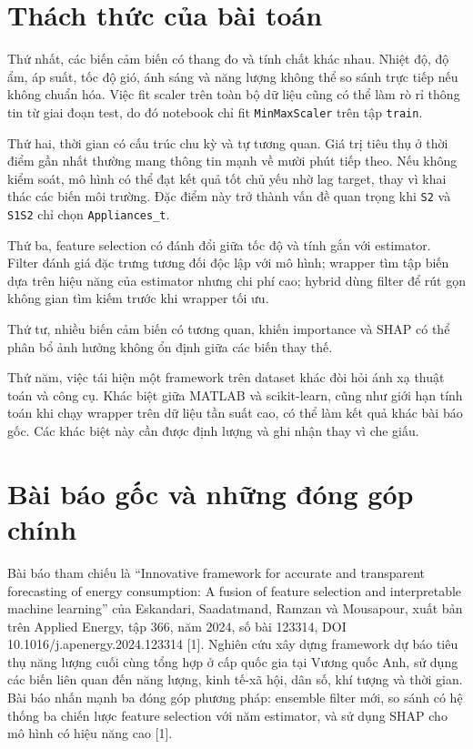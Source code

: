 \section{Thách thức của bài toán}\label{thuxe1ch-thux1ee9c-cux1ee7a-buxe0i-touxe1n}

Thứ nhất, các biến cảm biến có thang đo và tính chất khác nhau. Nhiệt độ, độ ẩm, áp suất, tốc độ gió, ánh sáng và năng lượng không thể so sánh trực tiếp nếu không chuẩn hóa. Việc fit scaler trên toàn bộ dữ liệu cũng có thể làm rò rỉ thông tin từ giai đoạn test, do đó notebook chỉ fit \texttt{MinMaxScaler} trên tập \texttt{train}.

Thứ hai, thời gian có cấu trúc chu kỳ và tự tương quan. Giá trị tiêu thụ ở thời điểm gần nhất thường mang thông tin mạnh về mười phút tiếp theo. Nếu không kiểm soát, mô hình có thể đạt kết quả tốt chủ yếu nhờ lag target, thay vì khai thác các biến môi trường. Đặc điểm này trở thành vấn đề quan trọng khi \texttt{S2} và \texttt{S1S2} chỉ chọn \texttt{Appliances\_t}.

Thứ ba, feature selection có đánh đổi giữa tốc độ và tính gắn với estimator. Filter đánh giá đặc trưng tương đối độc lập với mô hình; wrapper tìm tập biến dựa trên hiệu năng của estimator nhưng chi phí cao; hybrid dùng filter để rút gọn không gian tìm kiếm trước khi wrapper tối ưu.

Thứ tư, nhiều biến cảm biến có tương quan, khiến importance và SHAP có thể phân bổ ảnh hưởng không ổn định giữa các biến thay thế.

Thứ năm, việc tái hiện một framework trên dataset khác đòi hỏi ánh xạ thuật toán và công cụ. Khác biệt giữa MATLAB và scikit-learn, cũng như giới hạn tính toán khi chạy wrapper trên dữ liệu tần suất cao, có thể làm kết quả khác bài báo gốc. Các khác biệt này cần được định lượng và ghi nhận thay vì che giấu.

\section{Bài báo gốc và những đóng góp chính}\label{buxe0i-buxe1o-gux1ed1c-vuxe0-nhux1eefng-ux111uxf3ng-guxf3p-chuxednh}

Bài báo tham chiếu là ``Innovative framework for accurate and transparent forecasting of energy consumption: A fusion of feature selection and interpretable machine learning'' của Eskandari, Saadatmand, Ramzan và Mousapour, xuất bản trên Applied Energy, tập 366, năm 2024, số bài 123314, DOI 10.1016/j.apenergy.2024.123314 [1]. Nghiên cứu xây dựng framework dự báo tiêu thụ năng lượng cuối cùng tổng hợp ở cấp quốc gia tại Vương quốc Anh, sử dụng các biến liên quan đến năng lượng, kinh tế-xã hội, dân số, khí tượng và thời gian. Bài báo nhấn mạnh ba đóng góp phương pháp: ensemble filter mới, so sánh có hệ thống ba chiến lược feature selection với năm estimator, và sử dụng SHAP cho mô hình có hiệu năng cao [1].

